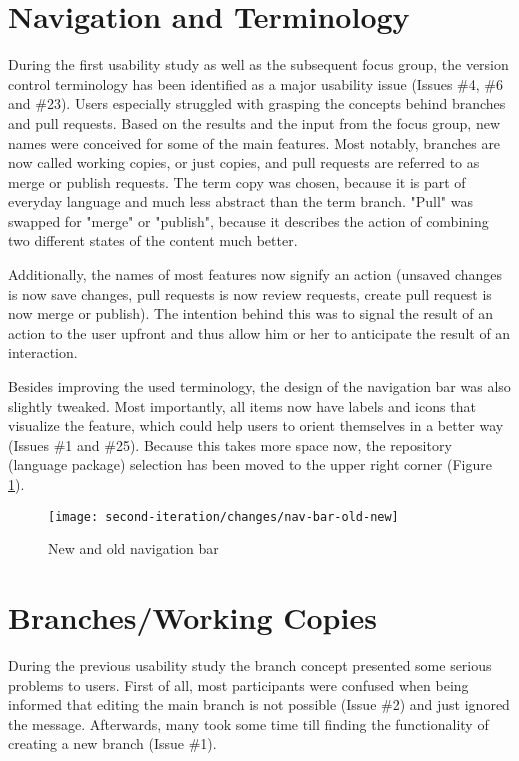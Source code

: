 \section{Navigation and Terminology} \label{sec:navigation-revised-terminology}
During the first usability study as well as the subsequent focus group, the version control terminology has been identified as a major usability issue (Issues \#4, \#6 and \#23). Users especially struggled with grasping the concepts behind branches and pull requests. Based on the results and the input from the focus group, new names were conceived for some of the main features. Most notably, branches are now called working copies, or just copies, and pull requests are referred to as merge or publish requests. The term copy was chosen, because it is part of everyday language and much less abstract than the term branch. "Pull" was swapped for "merge" or "publish", because it describes the action of combining two different states of the content much better.

Additionally, the names of most features now signify an action (unsaved changes is now save changes, pull requests is now review requests, create pull request is now merge or publish). The intention behind this was to signal the result of an action to the user upfront and thus allow him or her to anticipate the result of an interaction.

Besides improving the used terminology, the design of the navigation bar was also slightly tweaked. Most importantly, all items now have labels and icons that visualize the feature, which could help users to orient themselves in a better way (Issues \#1 and \#25). Because this takes more space now, the repository (language package) selection has been moved to the upper right corner (Figure \ref{fig:nav-bar-old-new}).

\begin{figure}[h!]
 \centering
 \texttt{[image: second-iteration/changes/nav-bar-old-new]}
 \caption{New and old navigation bar}
 \label{fig:nav-bar-old-new}
\end{figure}

\section{Branches/Working Copies}
During the previous usability study the branch concept presented some serious problems to users. First of all, most participants were confused when being informed that editing the main branch is not possible (Issue \#2) and just ignored the message. Afterwards, many took some time till finding the functionality of creating a new branch (Issue \#1).

